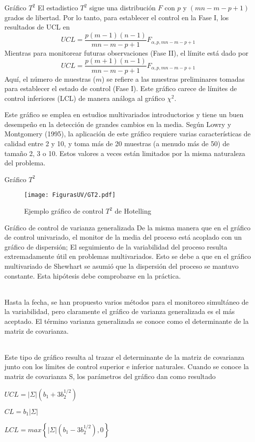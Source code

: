 \documentclass[10pt]{beamer}
\begin{document}
\begin{frame}{Gráfico $T^2$}
El estadistico $T^2$ sigue una distribución $F$ con $p$ y $(mn-m-p+1)$ grados de libertad. Por lo tanto, para establecer el control en la Fase I, los resultados de UCL en
$$UCL=\frac{p(m-1)(n-1)}{mn-m-p+1}F_{\alpha,p,mn-m-p+1}$$
Mientras para monitorear futuras observaciones (Fase II), el límite está dado por 
$$UCL=\frac{p(m+1)(n-1)}{mn-m-p+1}F_{\alpha,p,mn-m-p+1}$$
Aquí, el número de muestras ($m$) se refiere a las muestras preliminares tomadas para establecer el estado de control (Fase I). Este gráfico carece de límites de control inferiores (LCL) de manera análoga al gráfico $\chi^2$.

Este gráfico se emplea en estudios multivariados introductorios y tiene un buen desempeño en la detección de grandes cambios en la media. Según Lowry y Montgomery (1995), la aplicación de este gráfico requiere varias características de calidad entre 2 y 10, y toma más de 20 muestras (a menudo más de 50) de tamaño 2, 3 o 10. Estos valores a veces están limitados por la misma naturaleza del problema. 
\end{frame}

\begin{frame}{Gráfico $T^2$}
\begin{figure}[h!]
  \centering
  \texttt{[image: FigurasUV/GT2.pdf]}
  \caption{Ejemplo gráfico de control $T^2$ de Hotelling}
\end{figure}
\end{frame}

\begin{frame}{Gráfico de control de varianza generalizada}
De la misma manera que en el gráfico de control univariado, el monitor de la media del proceso está acoplado con un gráfico de dispersión; El seguimiento de la variabilidad del proceso resulta extremadamente útil en problemas multivariados. Esto se debe a que en el gráfico multivariado de Shewhart se asumió que la dispersión del proceso se mantuvo constante. Esta hipótesis debe comprobarse en la práctica.

~\\Hasta la fecha, se han propuesto varios métodos para el monitoreo simultáneo de la variabilidad, pero claramente el gráfico de varianza generalizada es el más aceptado. El término varianza generalizada se conoce como el determinante de la matriz de covarianza.

~\\Este tipo de gráfico resulta al trazar el determinante de la matriz de covarianza junto con los límites de control superior e inferior naturales. Cuando se conoce la matriz de covarianza S, los parámetros del gráfico dan como resultado
\begin{center}
$UCL=|\Sigma|(b_1 + 3b_2^{1/2})$

$CL=b_1|\Sigma|$

$LCL=max\left\lbrace|\Sigma|(b_1 -3b_2^{1/2}), 0\right\rbrace$
\end{center}
\end{frame}
\end{document}
